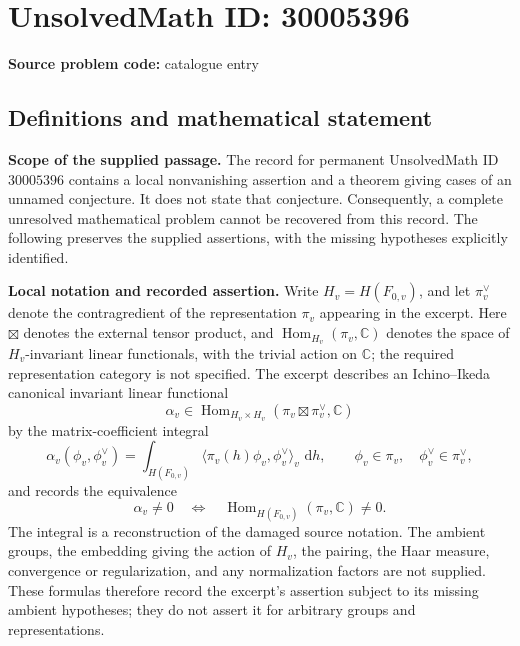 \documentclass[11pt]{article}
\newcommand{\C}{\mathbb{C}}
\newcommand{\dd}{\,\mathrm{d}}
\begin{document}
\section*{UnsolvedMath ID: 30005396}
\textbf{Source problem code:} catalogue entry
\subsection{Definitions and mathematical statement}
\textbf{Scope of the supplied passage.} The record for permanent UnsolvedMath ID \(30005396\) contains a local nonvanishing assertion and a theorem giving cases of an unnamed conjecture. It does not state that conjecture. Consequently, a complete unresolved mathematical problem cannot be recovered from this record. The following preserves the supplied assertions, with the missing hypotheses explicitly identified.

\textbf{Local notation and recorded assertion.} Write \(H_v=H(F_{0,v})\), and let \(\pi_v^\vee\) denote the contragredient of the representation \(\pi_v\) appearing in the excerpt. Here \(\boxtimes\) denotes the external tensor product, and \(\operatorname{Hom}_{H_v}(\pi_v,\C)\) denotes the space of \(H_v\)-invariant linear functionals, with the trivial action on \(\C\); the required representation category is not specified. The excerpt describes an Ichino--Ikeda canonical invariant linear functional
\[
\alpha_v\in\operatorname{Hom}_{H_v\times H_v}
  (\pi_v\boxtimes\pi_v^\vee,\C)
\]
by the matrix-coefficient integral
\[
\alpha_v(\phi_v,\phi_v^\vee)
 =\int_{H(F_{0,v})}
   \langle\pi_v(h)\phi_v,\phi_v^\vee\rangle_v\,\dd h,
\qquad
\phi_v\in\pi_v,\quad\phi_v^\vee\in\pi_v^\vee,
\]
and records the equivalence
\[
\alpha_v\ne0
\quad\Longleftrightarrow\quad
\operatorname{Hom}_{H(F_{0,v})}(\pi_v,\C)\ne0.
\]
The integral is a reconstruction of the damaged source notation. The ambient groups, the embedding giving the action of \(H_v\), the pairing, the Haar measure, convergence or regularization, and any normalization factors are not supplied. These formulas therefore record the excerpt's assertion subject to its missing ambient hypotheses; they do not assert it for arbitrary groups and representations.
\end{document}
